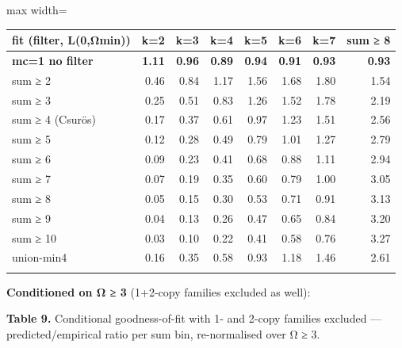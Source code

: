 \documentclass[
  10pt,
]{article}
\begin{document}
\begin{center}
\begin{adjustbox}{max width=\textwidth}
\begin{tabular}{@{}lrrrrrrr@{}}
\toprule\noalign{}
fit (filter, L(0,Ωmin)) & k=2 & k=3 & k=4 & k=5 & k=6 & k=7 & sum ≥ 8 \\
\midrule\noalign{}
\textbf{mc=1 no filter} & \textbf{1.11} & \textbf{0.96} & \textbf{0.89}
& \textbf{0.94} & \textbf{0.91} & \textbf{0.93} & \textbf{0.93} \\
sum ≥ 2 & 0.46 & 0.84 & 1.17 & 1.56 & 1.68 & 1.80 & 1.54 \\
sum ≥ 3 & 0.25 & 0.51 & 0.83 & 1.26 & 1.52 & 1.78 & 2.19 \\
sum ≥ 4 (Csurös) & 0.17 & 0.37 & 0.61 & 0.97 & 1.23 & 1.51 & 2.56 \\
sum ≥ 5 & 0.12 & 0.28 & 0.49 & 0.79 & 1.01 & 1.27 & 2.79 \\
sum ≥ 6 & 0.09 & 0.23 & 0.41 & 0.68 & 0.88 & 1.11 & 2.94 \\
sum ≥ 7 & 0.07 & 0.19 & 0.35 & 0.60 & 0.79 & 1.00 & 3.05 \\
sum ≥ 8 & 0.05 & 0.15 & 0.30 & 0.53 & 0.71 & 0.91 & 3.13 \\
sum ≥ 9 & 0.04 & 0.13 & 0.26 & 0.47 & 0.65 & 0.84 & 3.20 \\
sum ≥ 10 & 0.03 & 0.10 & 0.22 & 0.41 & 0.58 & 0.76 & 3.27 \\
union-min4 & 0.16 & 0.35 & 0.58 & 0.93 & 1.18 & 1.46 & 2.61 \\
\bottomrule\noalign{}
\end{tabular}
\end{adjustbox}
\end{center}

\textbf{Conditioned on Ω ≥ 3} (1+2-copy families excluded as well):

\textbf{Table 9.} Conditional goodness-of-fit with 1- and 2-copy
families excluded --- predicted/empirical ratio per sum bin,
re-normalised over Ω ≥ 3.
\end{document}
